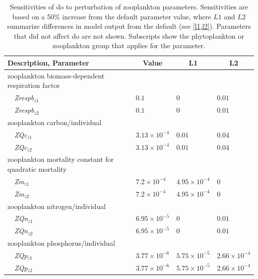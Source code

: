 \documentclass[letterpaper,12pt,oneside]{article}\usepackage[]{graphicx}\usepackage[]{color}
\begin{document}
\begin{table}[!tbp]
{\normalsize
\caption{Sensitivities of \ac{do} to perturbation of zooplankton parameters.  Sensitivities are based on a 50\% increase from the default parameter value, where $L1$ and $L2$ summarize differences in model output from the default (see \cref{l1,l2}).  Parameters that did not affect \ac{do} are not shown.  Subscripts show the phytoplankton or zooplankton group that applies for the parameter.\label{tab:zoopsens}} 
\begin{center}
\begin{tabular}{llll}
\hline\hline
\multicolumn{1}{l}{Description, Parameter}&\multicolumn{1}{c}{Value}&\multicolumn{1}{c}{L1}&\multicolumn{1}{c}{L2}\tabularnewline
\hline
{zooplankton biomass-dependent respiration factor}&&&\tabularnewline
~~\textit{Zrespb$_{z1}$}&$0.1$&$0$&$0.01$\tabularnewline
~~\textit{Zrespb$_{z2}$}&$0.1$&$0$&$0.01$\tabularnewline
\hline
{zooplankton carbon/individual}&&&\tabularnewline
~~\textit{ZQc$_{z1}$}&$3.13\times 10^{-4}$&$0.01$&$0.04$\tabularnewline
~~\textit{ZQc$_{z2}$}&$3.13\times 10^{-4}$&$0.01$&$0.04$\tabularnewline
\hline
{zooplankton mortality constant for quadratic mortality}&&&\tabularnewline
~~\textit{Zm$_{z1}$}&$7.2\times 10^{-4}$&$4.95\times 10^{-4}$&$0$\tabularnewline
~~\textit{Zm$_{z2}$}&$7.2\times 10^{-4}$&$4.95\times 10^{-4}$&$0$\tabularnewline
\hline
{zooplankton nitrogen/individual}&&&\tabularnewline
~~\textit{ZQn$_{z1}$}&$6.95\times 10^{-5}$&$0$&$0.01$\tabularnewline
~~\textit{ZQn$_{z2}$}&$6.95\times 10^{-5}$&$0$&$0.01$\tabularnewline
\hline
{zooplankton phosphorus/individual}&&&\tabularnewline
~~\textit{ZQp$_{z1}$}&$3.77\times 10^{-6}$&$5.75\times 10^{-5}$&$2.66\times 10^{-4}$\tabularnewline
~~\textit{ZQp$_{z2}$}&$3.77\times 10^{-6}$&$5.75\times 10^{-5}$&$2.66\times 10^{-4}$\tabularnewline
\hline
\end{tabular}\end{center}}

\end{table}
\end{document}
